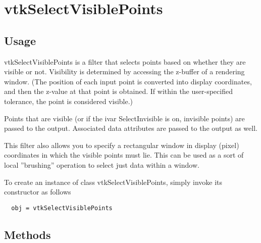 \section{vtkSelectVisiblePoints}

\subsection{Usage}

 vtkSelectVisiblePoints is a filter that selects points based on
 whether they are visible or not. Visibility is determined by
 accessing the z-buffer of a rendering window. (The position of each
 input point is converted into display coordinates, and then the
 z-value at that point is obtained. If within the user-specified
 tolerance, the point is considered visible.)

 Points that are visible (or if the ivar SelectInvisible is on,
 invisible points) are passed to the output. Associated data
 attributes are passed to the output as well.

 This filter also allows you to specify a rectangular window in display
 (pixel) coordinates in which the visible points must lie. This can be
 used as a sort of local ''brushing'' operation to select just data within
 a window.
 

To create an instance of class vtkSelectVisiblePoints, simply
invoke its constructor as follows
\begin{verbatim}
  obj = vtkSelectVisiblePoints
\end{verbatim}
\subsection{Methods}

